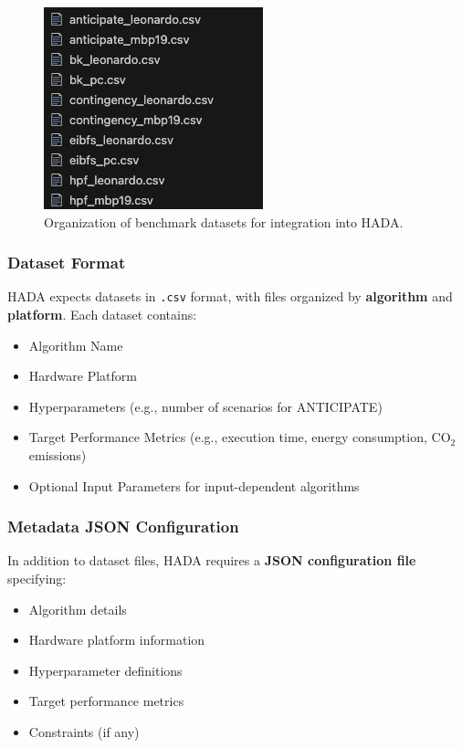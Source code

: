 \documentclass[a4paper,singleside,12pt]{report} %
\begin{document}
\begin{figure}[h!]
    \centering
    \includegraphics[width=0.8\linewidth]{imgs/benchmark-datasets.png}
    \caption{Organization of benchmark datasets for integration into HADA.}
    \label{fig:datasets_organization}
\end{figure}

\subsubsection{Dataset Format}

HADA expects datasets in \texttt{.csv} format, with files organized by \textbf{algorithm} and \textbf{platform}. Each dataset contains:
\begin{itemize}
    \item Algorithm Name
    \item Hardware Platform
    \item Hyperparameters (e.g., number of scenarios for ANTICIPATE)
    \item Target Performance Metrics (e.g., execution time, energy consumption, CO$_2$ emissions)
    \item Optional Input Parameters for input-dependent algorithms
\end{itemize}

\subsubsection{Metadata JSON Configuration}

In addition to dataset files, HADA requires a \textbf{JSON configuration file} specifying:
\begin{itemize}
    \item Algorithm details
    \item Hardware platform information
    \item Hyperparameter definitions
    \item Target performance metrics
    \item Constraints (if any)
\end{itemize}
\end{document}
